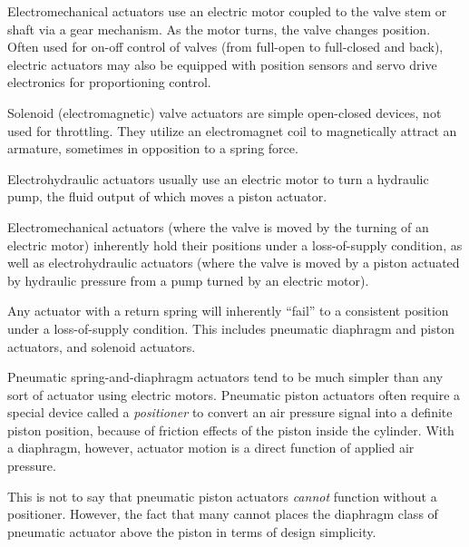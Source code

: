 \vskip 10pt

Electromechanical actuators use an electric motor coupled to the valve stem or shaft via a gear mechanism.  As the motor turns, the valve changes position.  Often used for on-off control of valves (from full-open to full-closed and back), electric actuators may also be equipped with position sensors and servo drive electronics for proportioning control.

\vskip 10pt

Solenoid (electromagnetic) valve actuators are simple open-closed devices, not used for throttling.  They utilize an electromagnet coil to magnetically attract an armature, sometimes in opposition to a spring force.

\vskip 10pt

Electrohydraulic actuators usually use an electric motor to turn a hydraulic pump, the fluid output of which moves a piston actuator.

\vskip 10pt

Electromechanical actuators (where the valve is moved by the turning of an electric motor) inherently hold their positions under a loss-of-supply condition, as well as electrohydraulic actuators (where the valve is moved by a piston actuated by hydraulic pressure from a pump turned by an electric motor).

\vskip 10pt

Any actuator with a return spring will inherently ``fail'' to a consistent position under a loss-of-supply condition.  This includes pneumatic diaphragm and piston actuators, and solenoid actuators.







Pneumatic spring-and-diaphragm actuators tend to be much simpler than any sort of actuator using electric motors.  Pneumatic piston actuators often require a special device called a {\it positioner} to convert an air pressure signal into a definite piston position, because of friction effects of the piston inside the cylinder.  With a diaphragm, however, actuator motion is a direct function of applied air pressure.

This is not to say that pneumatic piston actuators {\it cannot} function without a positioner.  However, the fact that many cannot places the diaphragm class of pneumatic actuator above the piston in terms of design simplicity.

